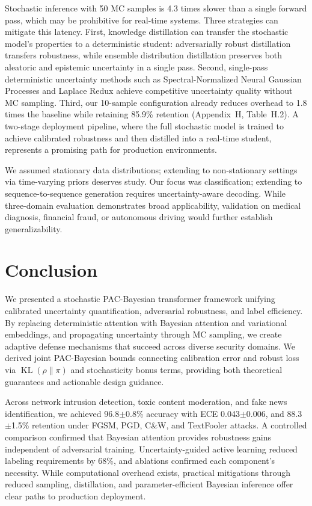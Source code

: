 \documentclass[12pt,a4paper]{article}
\theoremstyle{definition}
\DeclareMathOperator{\KL}{KL}
\begin{document}
Stochastic inference with 50 MC samples is 4.3 times slower than a single forward pass, which may be prohibitive for real-time systems. Three strategies can mitigate this latency. First, knowledge distillation can transfer the stochastic model's properties to a deterministic student: adversarially robust distillation \citep{goldblum2020adversarially} transfers robustness, while ensemble distribution distillation \citep{malinin2020ensemble} preserves both aleatoric and epistemic uncertainty in a single pass. Second, single-pass deterministic uncertainty methods such as Spectral-Normalized Neural Gaussian Processes \citep{liu2020simple} and Laplace Redux \citep{daxberger2021laplace} achieve competitive uncertainty quality without MC sampling. Third, our 10-sample configuration already reduces overhead to 1.8 times the baseline while retaining 85.9\% retention (Appendix~H, Table~H.2). A two-stage deployment pipeline, where the full stochastic model is trained to achieve calibrated robustness and then distilled into a real-time student, represents a promising path for production environments.

We assumed stationary data distributions; extending to non-stationary settings via time-varying priors deserves study. Our focus was classification; extending to sequence-to-sequence generation requires uncertainty-aware decoding. While three-domain evaluation demonstrates broad applicability, validation on medical diagnosis, financial fraud, or autonomous driving would further establish generalizability.

\section{Conclusion}

We presented a stochastic PAC-Bayesian transformer framework unifying calibrated uncertainty quantification, adversarial robustness, and label efficiency. By replacing deterministic attention with Bayesian attention and variational embeddings, and propagating uncertainty through MC sampling, we create adaptive defense mechanisms that succeed across diverse security domains. We derived joint PAC-Bayesian bounds connecting calibration error and robust loss via $\KL(\rho\|\pi)$ and stochasticity bonus terms, providing both theoretical guarantees and actionable design guidance.

Across network intrusion detection, toxic content moderation, and fake news identification, we achieved 96.8$\pm$0.8\% accuracy with ECE 0.043$\pm$0.006, and 88.3$\pm$1.5\% retention under FGSM, PGD, C\&W, and TextFooler attacks. A controlled comparison confirmed that Bayesian attention provides robustness gains independent of adversarial training. Uncertainty-guided active learning reduced labeling requirements by 68\%, and ablations confirmed each component's necessity. While computational overhead exists, practical mitigations through reduced sampling, distillation, and parameter-efficient Bayesian inference offer clear paths to production deployment.
\end{document}
